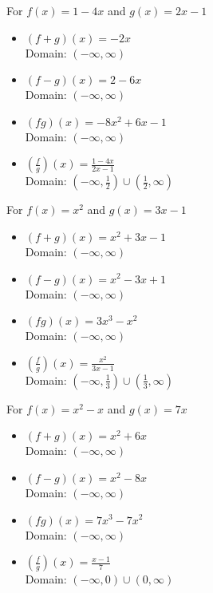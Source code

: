 \begin{exenum}
\item For $f(x) = 1-4x$ and $g(x) = 2x-1$

\begin{itemize}
\item $(f+g)(x) = -2x$ \\
      Domain: $(-\infty, \infty)$
\item $(f-g)(x) = 2-6x$ \\
      Domain:  $(-\infty, \infty)$
\item $(fg)(x) = -8x^2+6x-1$ \\
      Domain: $(-\infty, \infty)$
\item $\left(\frac{f}{g}\right)(x) = \frac{1-4x}{2x-1}$ \\
      Domain:  $\left(-\infty, \frac{1}{2} \right) \cup \left(\frac{1}{2}, \infty \right)$
\end{itemize}

\item For $f(x) = x^2$ and $g(x) = 3x-1$

\begin{itemize}
\item $(f+g)(x) = x^2+3x-1$ \\
      Domain: $(-\infty, \infty)$
\item $(f-g)(x) = x^2-3x+1$ \\
      Domain:  $(-\infty, \infty)$
\item $(fg)(x) = 3x^3-x^2$ \\
      Domain: $(-\infty, \infty)$
\item $\left(\frac{f}{g}\right)(x) = \frac{x^2}{3x-1}$ \\
      Domain:  $\left(-\infty, \frac{1}{3} \right) \cup \left(\frac{1}{3}, \infty \right)$
\end{itemize}

\item For $f(x) = x^2-x$ and $g(x) = 7x$

\begin{itemize}
\item $(f+g)(x) = x^2+6x$ \\
      Domain: $(-\infty, \infty)$
\item $(f-g)(x) = x^2-8x$ \\
      Domain:  $(-\infty, \infty)$
\item $(fg)(x) = 7x^3-7x^2$ \\
      Domain: $(-\infty, \infty)$
\item $\left(\frac{f}{g}\right)(x) = \frac{x-1}{7}$ \\
      Domain:  $\left(-\infty, 0 \right) \cup \left(0, \infty \right)$
\end{itemize}



\end{exenum}
